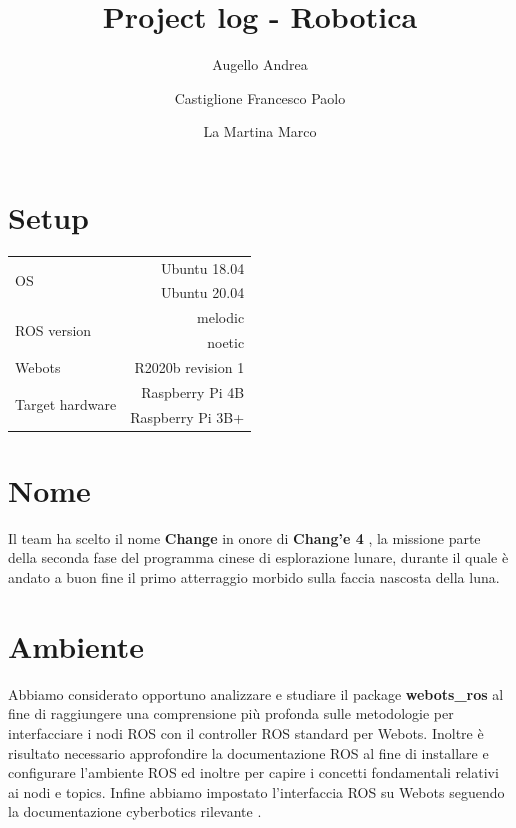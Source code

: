 \documentclass[a4paper]{article}
\begin{document}
	\title{Project log - Robotica}
	\author{Augello Andrea \and Castiglione Francesco Paolo \and La Martina Marco}
	\maketitle
	\tableofcontents

	\section{Setup}\label{sec:Setup}
	\begin{tabular}{|l|r|}
		\hline
		\multirow{2}{4em}{OS} & Ubuntu 18.04 \\
							  & Ubuntu 20.04 \\ \hline
		\multirow{2}{6em}{ROS version} & melodic \\
									   & noetic \\ \hline
		Webots & R2020b revision 1\\ \hline
		\multirow{2}{11em}{Target hardware} & Raspberry Pi 4B \\
											& Raspberry Pi 3B+ \\ \hline
	\end{tabular}

	\section{Nome}\label{sec:Nome}
	Il team ha scelto il nome \textbf{Change} in onore di \textbf{Chang'e 4} \cite{change4}, la missione parte della seconda fase del programma cinese di esplorazione lunare, durante il quale è andato a buon fine il primo atterraggio morbido sulla faccia nascosta della luna. 

	\section{Ambiente}\label{sec:Ambiente}
	Abbiamo considerato opportuno analizzare e studiare il package \textbf{webots\_ros} \cite{cyberbotics} al fine di raggiungere una comprensione più profonda sulle metodologie per interfacciare i nodi ROS con il controller ROS standard per Webots. Inoltre è risultato necessario approfondire la documentazione ROS \cite{ros.org} al fine di installare e configurare l'ambiente ROS ed inoltre per capire i concetti fondamentali relativi ai nodi e topics. Infine abbiamo impostato l'interfaccia ROS su Webots seguendo la documentazione cyberbotics rilevante \cite{webotsRosSetup}.
	
\end{document}
